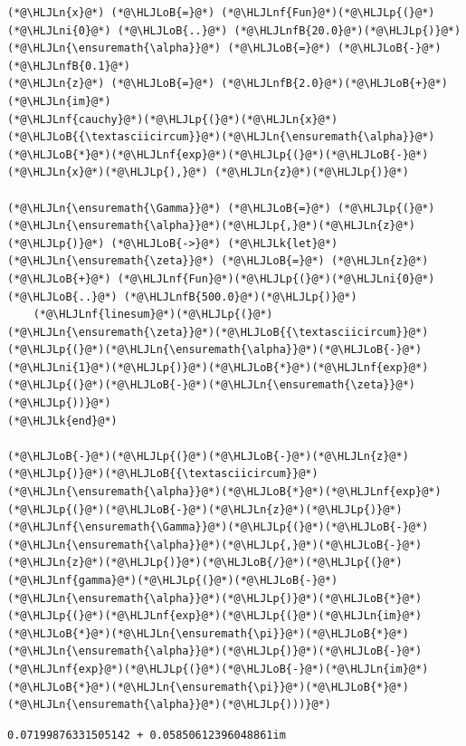 \documentclass[12pt,a4paper]{article}
\newcommand{\HLJLk}[1]{\textcolor[RGB]{148,91,176}{\textbf{#1}}}
\newcommand{\HLJLn}[1]{#1}
\newcommand{\HLJLnf}[1]{\textcolor[RGB]{66,102,213}{#1}}
\newcommand{\HLJLnfB}[1]{\textcolor[RGB]{59,151,46}{#1}}
\newcommand{\HLJLni}[1]{\textcolor[RGB]{59,151,46}{#1}}
\newcommand{\HLJLoB}[1]{\textcolor[RGB]{102,102,102}{\textbf{#1}}}
\newcommand{\HLJLp}[1]{#1}
\begin{document}
\begin{lstlisting}
(*@\HLJLn{x}@*) (*@\HLJLoB{=}@*) (*@\HLJLnf{Fun}@*)(*@\HLJLp{(}@*)(*@\HLJLni{0}@*) (*@\HLJLoB{..}@*) (*@\HLJLnfB{20.0}@*)(*@\HLJLp{)}@*)
(*@\HLJLn{\ensuremath{\alpha}}@*) (*@\HLJLoB{=}@*) (*@\HLJLoB{-}@*)(*@\HLJLnfB{0.1}@*)
(*@\HLJLn{z}@*) (*@\HLJLoB{=}@*) (*@\HLJLnfB{2.0}@*)(*@\HLJLoB{+}@*)(*@\HLJLn{im}@*)
(*@\HLJLnf{cauchy}@*)(*@\HLJLp{(}@*)(*@\HLJLn{x}@*)(*@\HLJLoB{{\textasciicircum}}@*)(*@\HLJLn{\ensuremath{\alpha}}@*)(*@\HLJLoB{*}@*)(*@\HLJLnf{exp}@*)(*@\HLJLp{(}@*)(*@\HLJLoB{-}@*)(*@\HLJLn{x}@*)(*@\HLJLp{),}@*) (*@\HLJLn{z}@*)(*@\HLJLp{)}@*)

(*@\HLJLn{\ensuremath{\Gamma}}@*) (*@\HLJLoB{=}@*) (*@\HLJLp{(}@*)(*@\HLJLn{\ensuremath{\alpha}}@*)(*@\HLJLp{,}@*)(*@\HLJLn{z}@*)(*@\HLJLp{)}@*) (*@\HLJLoB{->}@*) (*@\HLJLk{let}@*) (*@\HLJLn{\ensuremath{\zeta}}@*) (*@\HLJLoB{=}@*) (*@\HLJLn{z}@*) (*@\HLJLoB{+}@*) (*@\HLJLnf{Fun}@*)(*@\HLJLp{(}@*)(*@\HLJLni{0}@*) (*@\HLJLoB{..}@*) (*@\HLJLnfB{500.0}@*)(*@\HLJLp{)}@*)
    (*@\HLJLnf{linesum}@*)(*@\HLJLp{(}@*)(*@\HLJLn{\ensuremath{\zeta}}@*)(*@\HLJLoB{{\textasciicircum}}@*)(*@\HLJLp{(}@*)(*@\HLJLn{\ensuremath{\alpha}}@*)(*@\HLJLoB{-}@*)(*@\HLJLni{1}@*)(*@\HLJLp{)}@*)(*@\HLJLoB{*}@*)(*@\HLJLnf{exp}@*)(*@\HLJLp{(}@*)(*@\HLJLoB{-}@*)(*@\HLJLn{\ensuremath{\zeta}}@*)(*@\HLJLp{))}@*)
(*@\HLJLk{end}@*)

(*@\HLJLoB{-}@*)(*@\HLJLp{(}@*)(*@\HLJLoB{-}@*)(*@\HLJLn{z}@*)(*@\HLJLp{)}@*)(*@\HLJLoB{{\textasciicircum}}@*)(*@\HLJLn{\ensuremath{\alpha}}@*)(*@\HLJLoB{*}@*)(*@\HLJLnf{exp}@*)(*@\HLJLp{(}@*)(*@\HLJLoB{-}@*)(*@\HLJLn{z}@*)(*@\HLJLp{)}@*)(*@\HLJLnf{\ensuremath{\Gamma}}@*)(*@\HLJLp{(}@*)(*@\HLJLoB{-}@*)(*@\HLJLn{\ensuremath{\alpha}}@*)(*@\HLJLp{,}@*)(*@\HLJLoB{-}@*)(*@\HLJLn{z}@*)(*@\HLJLp{)}@*)(*@\HLJLoB{/}@*)(*@\HLJLp{(}@*)(*@\HLJLnf{gamma}@*)(*@\HLJLp{(}@*)(*@\HLJLoB{-}@*)(*@\HLJLn{\ensuremath{\alpha}}@*)(*@\HLJLp{)}@*)(*@\HLJLoB{*}@*)(*@\HLJLp{(}@*)(*@\HLJLnf{exp}@*)(*@\HLJLp{(}@*)(*@\HLJLn{im}@*)(*@\HLJLoB{*}@*)(*@\HLJLn{\ensuremath{\pi}}@*)(*@\HLJLoB{*}@*)(*@\HLJLn{\ensuremath{\alpha}}@*)(*@\HLJLp{)}@*)(*@\HLJLoB{-}@*)(*@\HLJLnf{exp}@*)(*@\HLJLp{(}@*)(*@\HLJLoB{-}@*)(*@\HLJLn{im}@*)(*@\HLJLoB{*}@*)(*@\HLJLn{\ensuremath{\pi}}@*)(*@\HLJLoB{*}@*)(*@\HLJLn{\ensuremath{\alpha}}@*)(*@\HLJLp{)))}@*)
\end{lstlisting}

\begin{lstlisting}
0.07199876331505142 + 0.05850612396048861im
\end{lstlisting}
\end{document}
